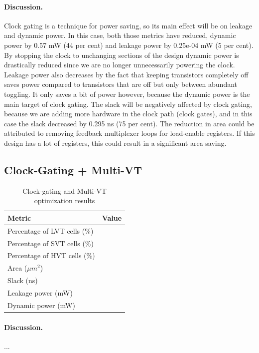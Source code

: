 \documentclass[11pt,a4paper]{article}
\begin{document}
\paragraph{Discussion.} Clock gating is a technique for power saving, so its main effect will be on leakage and dynamic power. In this case, both those metrics have reduced, dynamic power by 0.57 mW (44 per cent) and leakage power by 0.25e-04 mW (5 per cent). By stopping the clock to unchanging sections of the design dynamic power is drastically reduced since we are no longer unnecessarily powering the clock. Leakage power also decreases by the fact that keeping transistors completely off saves power compared to transistors that are off but only between abundant toggling. It only saves a bit of power however, because the dynamic power is the main target of clock gating. 
The slack will be negatively affected by clock gating, because we are adding more hardware in the clock path (clock gates), and in this case the slack decreased by 0.295 ns (75 per cent). The reduction in area could be attributed to removing feedback multiplexer loops for load-enable registers. If this design has a lot of registers, this could result in a significant area saving.  

\subsection{Clock-Gating + Multi-VT}

\begin{table}[h]
\centering
\caption{Clock-gating and Multi-VT optimization results}
\begin{tabular}{lc}
\toprule
\textbf{Metric} & \textbf{Value} \\
\midrule
Percentage of LVT cells (\%) &  \\
Percentage of SVT cells (\%) &  \\
Percentage of HVT cells (\%) &  \\
Area ($\mu m^2$) &  \\
Slack (ns) &  \\
Leakage power (mW) &  \\
Dynamic power (mW) &  \\
\bottomrule
\end{tabular}
\end{table}

\paragraph{Discussion.} ...
\end{document}
